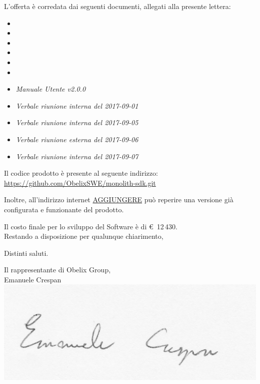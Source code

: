 \documentclass[10 pt,a4paper]{article}
\begin{document}
L'offerta è corredata dai seguenti documenti, allegati alla presente
lettera:
\vspace{.1in}
\begin{itemize}
\item \analisideirequisiti
\item \pianodiprogetto
\item \pianodiqualifica
\item \normediprogetto
\item \gloss
\item {}
\item \emph{Manuale Utente v2.0.0}
\item \emph{Verbale riunione interna del 2017-09-01}
\item \emph{Verbale riunione interna del 2017-09-05}
\item \emph{Verbale riunione esterna del 2017-09-06}
\item \emph{Verbale riunione interna del 2017-09-07}
\end{itemize}

Il codice prodotto è presente al seguente indirizzo: \\
\url{https://github.com/ObelixSWE/monolith-sdk.git}

\clearpage

Inoltre, all'indirizzo internet \url{AGGIUNGERE} può reperire una versione già configurata e funzionante del prodotto. \\


\vspace{.1in}


Il costo finale per lo sviluppo del Software è di \euro  \, 12\,430. \\

\vspace{.1in}
Restando a disposizione per qualunque chiarimento,\\

\vspace{.1in}

Distinti saluti.

\vspace{.15in}


\begin{flushright}
Il rappresentante di Obelix Group,\\
Emanuele Crespan\\
\includegraphics[width=.5\textwidth]{../../file_comuni/firme/ec.jpg}
\end{flushright}
\end{document}
